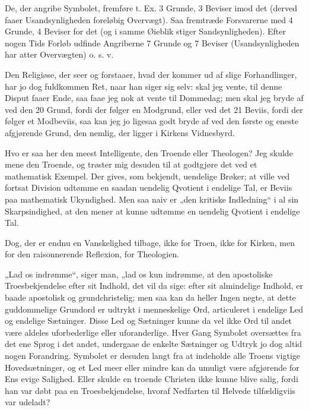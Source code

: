 \documentclass[12pt,a4paper]{book}
\newcommand{\opage}[1]{\marginnote{\footnotesize\textit{[#1]}}}
\begin{document}
De, der angribe Symbolet, fremføre t. Ex. 3 Grunde, 3 Beviser imod det (derved
faaer Usandsynligheden foreløbig Overvægt). Saa fremtræde Forsvarerne med 4
Grunde, 4 Beviser for det (og i samme Øieblik stiger Sandsynligheden). Efter
nogen Tids Forløb udfinde Angriberne 7 Grunde og 7 Beviser (Usandsynligheden
har atter Overvægten) o. s. v.

Den Religiøse, der seer og forstaaer, hvad der kommer ud af slige
Forhandlinger, har jo dog fuldkommen Ret, naar han siger sig selv: skal jeg
vente, til denne Disput faaer Ende, saa faae jeg nok at vente til Dommedag; men
skal jeg bryde af ved den 20 Grund, fordi der følger en Modgrund, eller ved det
21 Beviis, fordi der følger et Modbeviis, saa kan jeg jo ligesaa godt bryde af
ved den første og eneste afgjørende Grund, den nemlig, der ligger i Kirkens
Vidnesbyrd.

Hvo er saa her den meest Intelligente, den Troende eller Theologen? Jeg skulde
mene den Troende, og trøster mig desuden til at godtgjøre det ved et
mathematisk Exempel. Der gives, som bekjendt, uendelige Brøker; at ville ved
fortsat Division udtømme en saadan uendelig Qvotient i endelige Tal, er Beviis
paa mathematisk Ukyndighed. Men saa naiv er „den kritiske Indledning“ i al sin
Skarpsindighed, at den mener at kunne udtømme en uendelig Qvotient i endelige
Tal.

Dog, der er endnu en Vanskelighed tilbage, ikke for Troen, ikke for Kirken, men
for den raisonnerende Reflexion, for Theologien.

„Lad os indrømme“, siger man, „lad os kun indrømme, at den apostoliske
Troesbekjendelse efter sit Indhold, det vil da sige: efter sit almindelige
Indhold, er baade apostolisk og grundchristelig; men saa kan da heller Ingen
negte, at dette guddommelige Grundord er udtrykt i menneskelige Ord,
articuleret i endelige Led og
\opage{24} endelige Sætninger. Disse Led og Sætninger kunne da vel ikke Ord til andet være
aldeles uforbederlige eller uforanderlige. Hver Gang Symbolet oversættes fra
det ene Sprog i det andet, undergaae de enkelte Sætninger og Udtryk jo dog
altid nogen Forandring. Symbolet er desuden langt fra at indeholde alle Troens
vigtige Hovedsætninger, og et Led meer eller mindre kan da umuligt være
afgjørende for Ens evige Salighed. Eller skulde en troende Christen ikke kunne
blive salig, fordi han var døbt paa en Troesbekjendelse, hvoraf Nedfarten til
Helvede tilfældigviis var udeladt?
\end{document}
